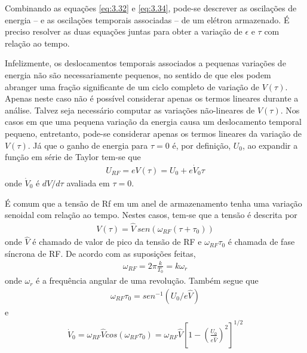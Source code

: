 Combinando as equações \eqref{eq:3.32} e \eqref{eq:3.34}, pode-se descrever as oscilações de energia -- e as oscilações temporais associadas --  de um elétron armazenado. É preciso resolver as duas equações juntas para obter a variação de $\epsilon$ e $\tau$ com relação ao tempo.

Infelizmente, os deslocamentos temporais associados a pequenas variações de energia não são necessariamente pequenos, no sentido de que eles podem abranger uma fração significante de um ciclo completo de variação de $V(\tau)$. Apenas neste caso não é possível considerar apenas os termos lineares durante a análise. Talvez seja necessário computar as variações não-lineares de $V(\tau)$. Nos casos em que uma pequena variação da energia causa um deslocamento temporal pequeno, entretanto, pode-se considerar apenas os termos lineares da variação de $V(\tau)$. Já que o ganho de energia para $\tau=0$ é, por definição, $U_0$, ao expandir a função em série de Taylor tem-se que
\begin{align}
	U_{RF} = eV(\tau) = U_0 + e\dot{V}_0\tau\label{eq:3.35}
\end{align}
onde $\dot{V}_0$ é $dV/d\tau$ avaliada em $\tau=0$.

É comum que a tensão de Rf em um anel de armazenamento tenha uma variação senoidal com relação ao tempo. Nestes casos, tem-se que a tensão é descrita por
\begin{align}
	V(\tau) = \widehat{V}\ sen(\omega_{RF}(\tau+\tau_0))\label{eq:3.36}
\end{align}
onde $\widehat{V}$ é chamado de valor de pico da tensão de RF e $\omega_{RF}\tau_0$ é chamada de fase síncrona de RF. De acordo com as suposições feitas,
\begin{align}
	\omega_{RF} = 2\pi \frac{k}{T_0} = k\omega_r
\end{align}
onde $\omega_r$ é a frequência angular de uma revolução. Também segue que
\begin{align}
	\omega_{RF}\tau_0 = sen^{-1}(U_0/e\widehat{V})
\end{align}
e
\begin{align}
	\dot{V}_0 = \omega_{RF}\widehat{V}cos(\omega_{RF}\tau_0) = \omega_{RF}\widehat{V}\left[1-\left(\frac{U_0}{e\widehat{V}}\right)^2\right]^{1/2}
\end{align}

